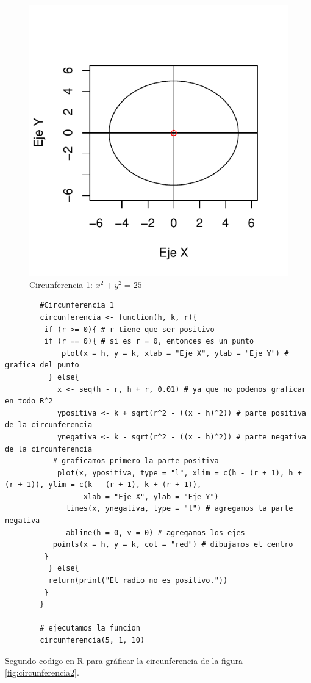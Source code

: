 \documentclass[12pt,a4paper]{article}
\begin{document}
\begin{figure}
\centering
\includegraphics[scale=.8]{CIR1}
\caption{Circunferencia 1: $ x^2+y^2=25 $}
\label{fig:circunferencia1}
\end{figure}

\begin{table}[htpb]
	\begin{lstlisting}
		#Circunferencia 1
		circunferencia <- function(h, k, r){
 		 if (r >= 0){ # r tiene que ser positivo
   		 if (r == 0){ # si es r = 0, entonces es un punto
 		     plot(x = h, y = k, xlab = "Eje X", ylab = "Eje Y") # grafica del punto
  		  } else{
  		    x <- seq(h - r, h + r, 0.01) # ya que no podemos graficar en todo R^2
  		    ypositiva <- k + sqrt(r^2 - ((x - h)^2)) # parte positiva de la circunferencia
  		    ynegativa <- k - sqrt(r^2 - ((x - h)^2)) # parte negativa de la circunferencia
   		   # graficamos primero la parte positiva
  		    plot(x, ypositiva, type = "l", xlim = c(h - (r + 1), h + (r + 1)), ylim = c(k - (r + 1), k + (r + 1)),
     		      xlab = "Eje X", ylab = "Eje Y")
    		  lines(x, ynegativa, type = "l") # agregamos la parte negativa
    		  abline(h = 0, v = 0) # agregamos los ejes
   		   points(x = h, y = k, col = "red") # dibujamos el centro
   		 }
		  } else{
  		  return(print("El radio no es positivo."))
 		 }
		}
		
		# ejecutamos la funcion
		circunferencia(5, 1, 10)
	\end{lstlisting}
	\caption{Segundo codigo en R para gráficar la circunferencia de la figura \ref{fig:circunferencia2}.}
	\label{alg:cir1}
\end{table}
\end{document}
